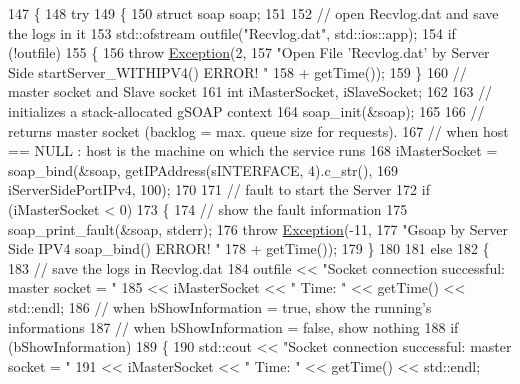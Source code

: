 \begin{DoxyCode}
147 \{
148     \textcolor{keywordflow}{try}
149     \{
150         \textcolor{keyword}{struct }soap soap;
151 
152         \textcolor{comment}{// open Recvlog.dat and save the logs in it}
153         std::ofstream outfile(\textcolor{stringliteral}{"Recvlog.dat"}, std::ios::app);
154         \textcolor{keywordflow}{if} (!outfile)
155         \{
156             \textcolor{keywordflow}{throw} \hyperlink{classException}{Exception}(2,
157                     \textcolor{stringliteral}{"Open File 'Recvlog.dat' by Server Side startServer\_WITHIPV4() ERROR! "}
158                             + getTime());
159         \}
160         \textcolor{comment}{// master socket and Slave socket}
161         \textcolor{keywordtype}{int} iMasterSocket, iSlaveSocket;
162 
163         \textcolor{comment}{// initializes a stack-allocated gSOAP context}
164         soap\_init(&soap);
165 
166         \textcolor{comment}{// returns master socket (backlog = max. queue size for requests).}
167         \textcolor{comment}{// when host == NULL : host is the machine on which the service runs}
168         iMasterSocket = soap\_bind(&soap, getIPAddress(sINTERFACE, 4).c\_str(),
169                 iServerSidePortIPv4, 100);
170 
171         \textcolor{comment}{// fault to start the Server}
172         \textcolor{keywordflow}{if} (iMasterSocket < 0)
173         \{
174             \textcolor{comment}{// show the fault information}
175             soap\_print\_fault(&soap, stderr);
176             \textcolor{keywordflow}{throw} \hyperlink{classException}{Exception}(-11,
177                     \textcolor{stringliteral}{"Gsoap by Server Side IPV4 soap\_bind() ERROR! "}
178                             + getTime());
179         \}
180 
181         \textcolor{keywordflow}{else}
182         \{
183             \textcolor{comment}{// save the logs in Recvlog.dat}
184             outfile << \textcolor{stringliteral}{"Socket connection successful: master socket = "}
185                     << iMasterSocket << \textcolor{stringliteral}{" Time: "} << getTime() << std::endl;
186             \textcolor{comment}{// when bShowInformation = true, show the running's informations}
187             \textcolor{comment}{// when bShowInformation = false, show nothing}
188             \textcolor{keywordflow}{if} (bShowInformation)
189             \{
190                 std::cout << \textcolor{stringliteral}{"Socket connection successful: master socket = "}
191                         << iMasterSocket << \textcolor{stringliteral}{" Time: "} << getTime() << std::endl;

\end{DoxyCode}

